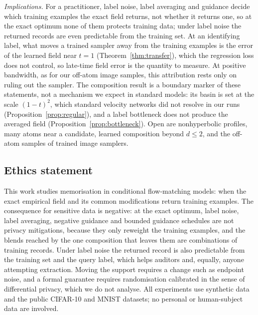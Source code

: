 \emph{Implications.} For a practitioner, label noise, label averaging and guidance decide which
training examples the exact field returns, not whether it returns one, so at the exact optimum
none of them protects training data; under label noise the returned records are even predictable
from the training set. At an identifying label, what moves a trained sampler away from the
training examples is the error of the learned field near $t=1$ (Theorem~\ref{thm:transfer}),
which the regression loss does not control, so late-time field error is the quantity to measure.
At positive bandwidth, as for our off-atom image samples, this attribution rests only on ruling
out the sampler. The composition result is a boundary marker of these statements, not a mechanism
we expect in standard models: its basin is set at the scale $(1-t)^2$, which standard velocity
networks did not resolve in our runs (Proposition~\ref{prop:regular}), and a label bottleneck does
not produce the averaged field (Proposition~\ref{prop:bottleneck}). Open are nonhyperbolic
profiles, many atoms near a candidate, learned composition beyond $d\le2$, and the off-atom
samples of trained image samplers.


\subsection*{Ethics statement}
This work studies memorisation in conditional flow-matching models: when the exact empirical field
and its common modifications return training examples. The consequence for sensitive data is
negative: at the exact optimum, label noise, label averaging, negative guidance and bounded
guidance schedules are not privacy mitigations, because they only reweight the training examples,
and the blends reached by the one composition that leaves them are combinations of training
records. Under label noise the returned record is also predictable from the training set and the
query label, which helps auditors and, equally, anyone attempting extraction. Moving the support
requires a change such as endpoint noise, and a formal guarantee requires randomisation calibrated
in the sense of differential privacy, which we do not analyse. All experiments use synthetic data
and the public CIFAR-10 and MNIST datasets; no personal or human-subject data are involved.
